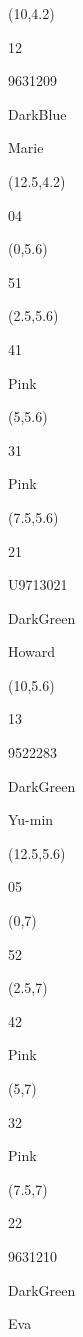 \documentclass[a4paper]{article}
\newcommand{\myseat}[4]{%
\vspace{-0.1cm}
\parbox[t][2.2cm][t]{3.5cm}{
\small #1 %
\begin{description}
\vspace{-0.1cm}
\item [ID:] #2
\vspace{-0.1cm}
\item [Team:] #3 \normalsize
\vspace{-0.1cm}
\item \normalsize #4
\vspace{-0.1cm}
\end{description}
}
}
\begin{document}
\begin{CJK}{UTF8}{cyberbit}
\begin{textblock}{2.5}(10,4.2)
	\myseat{12}{9631209}{DarkBlue}{Marie}
\end{textblock}

\begin{textblock}{2.5}(12.5,4.2)
\textblockcolor{}
	\myseat{04}{}{}{}
\end{textblock}

\begin{textblock}{2.5}(0,5.6)
\textblockcolor{}
\myseat{51}{}{}{}
\end{textblock}

\begin{textblock}{2.5}(2.5,5.6)
\myseat{41}{}{Pink}{}
\end{textblock}

\begin{textblock}{2.5}(5,5.6)
\myseat{31}{}{Pink}{}
\end{textblock}

\begin{textblock}{2.5}(7.5,5.6)
\myseat{21}{U9713021}{DarkGreen}{Howard}
\end{textblock}

\begin{textblock}{2.5}(10,5.6)
\myseat{13}{9522283}{DarkGreen}{Yu-min}
\end{textblock}

\begin{textblock}{2.5}(12.5,5.6)
\textblockcolor{}
\myseat{05}{}{}{}
\end{textblock}

\begin{textblock}{2.5}(0,7)
\textblockcolor{}
\myseat{52}{}{}{}
\end{textblock}

\begin{textblock}{2.5}(2.5,7)
\myseat{42}{}{Pink}{}
\end{textblock}

\begin{textblock}{2.5}(5,7)
\myseat{32}{}{Pink}{}
\end{textblock}

\begin{textblock}{2.5}(7.5,7)
\myseat{22}{9631210}{DarkGreen}{Eva}
\end{textblock}


\end{CJK}
\end{document}
